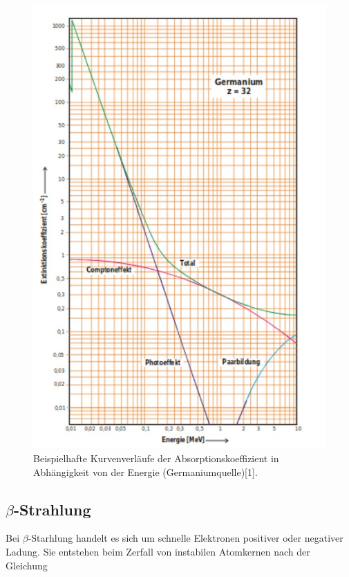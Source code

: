 \begin{figure}
  \centering
  \includegraphics[scale=0.3]{content/ger.jpg}
  \caption{Beispielhafte Kurvenverläufe der Absorptionskoeffizient in Abhängigkeit von der Energie (Germaniumquelle)[1].}
  \label{fig:ger}
\end{figure}

\subsection{\texorpdfstring{$\beta$-Strahlung}{Beta-Strahlung}}

Bei $\beta$-Starhlung handelt es sich um schnelle Elektronen positiver oder 
negativer Ladung. Sie entstehen beim Zerfall von instabilen Atomkernen nach 
der Gleichung 

